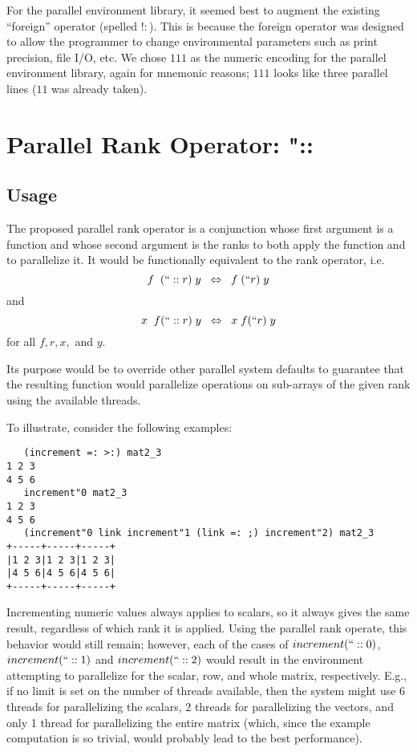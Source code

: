 For the parallel environment library, 
it seemed best to augment the existing ``foreign'' operator (spelled $!:$).
This is because the foreign operator was designed to 
allow the programmer to change environmental parameters 
such as print precision, file I/O, etc. \cite{jvocab}
We chose $111$ as the numeric encoding for the parallel environment library, again for mnemonic reasons; 
$111$ looks like three parallel lines ($11$ was already taken).

\section{Parallel Rank Operator: \ttfamily"::\normalfont}
\label{prank}

\subsection{Usage}
The proposed parallel rank operator is a conjunction 
whose first argument is a function 
and whose second argument is the ranks to both apply the function and to parallelize it. 
It would be functionally equivalent to the rank operator, i.e. 
\[f\;\;(``::r)\;y\;\;\Leftrightarrow\;\;f\;(``r)\;y\] and \[x\;\;f(``::r)\;y\;\;\Leftrightarrow\;\;x\;f(``r)\;y\] for all $f, r, x,$ and $y$.

Its purpose would be to override other parallel system defaults 
to guarantee that the resulting function would parallelize operations on sub-arrays of the given rank 
using the available threads.

To illustrate, consider the following examples:

\begin{singlespacing}
\begin{small}
\begin{verbatim}
   (increment =: >:) mat2_3
1 2 3
4 5 6
   increment"0 mat2_3
1 2 3
4 5 6
   (increment"0 link increment"1 (link =: ;) increment"2) mat2_3
+-----+-----+-----+
|1 2 3|1 2 3|1 2 3|
|4 5 6|4 5 6|4 5 6|
+-----+-----+-----+
\end{verbatim}
\end{small}
\end{singlespacing}

Incrementing numeric values always applies to scalars, so it always gives the same result, 
regardless of which rank it is applied. 
Using the parallel rank operate, this behavior would still remain; 
however, each of the cases of $increment(``::0)$, $increment(``::1)$ and $increment(``::2)$ 
would result in the environment attempting to parallelize for the scalar, row, and whole matrix, respectively.
E.g., if no limit is set on the number of threads available, 
then the system might use 6 threads for parallelizing the scalars, 
2 threads for parallelizing the vectors, 
and only 1 thread for parallelizing the entire matrix 
(which, since the example computation is so trivial, would probably lead to the best performance).

